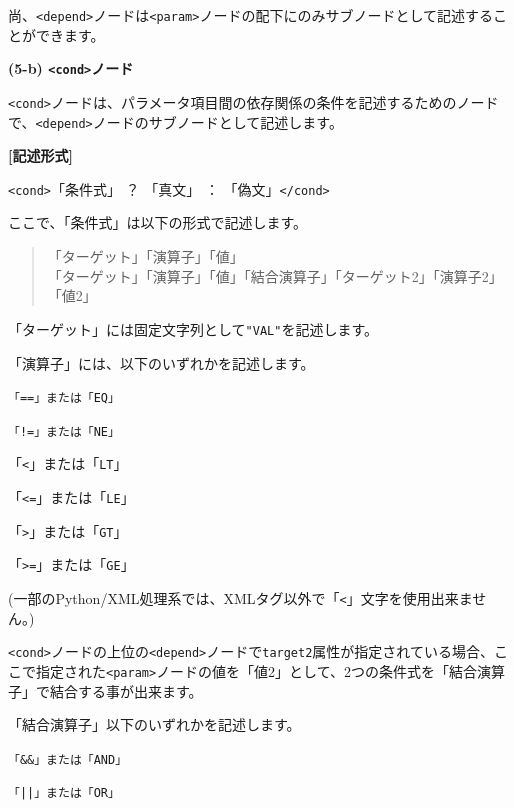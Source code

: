 \documentclass[a4paper,11pt]{jarticle}
\begin{document}
{\vspace{12pt}
尚、\texttt{<depend>}ノードは\texttt{<param>}ノードの配下にのみサブノードとして記述することができます。

\vspace{12pt}
\textbf{(5-b) \texttt{<cond>}ノード}

\texttt{<cond>}ノードは、パラメータ項目間の依存関係の条件を記述するためのノードで、\texttt{<depend>}ノードのサブノードとして記述します。

\vspace{8pt}
\leftskip=12pt
\textbf{[記述形式]}

\leftskip=42pt
\texttt{<cond>}「条件式」 ？ 「真文」 ： 「偽文」\texttt{</cond>}

\vspace{8pt}
\leftskip=0pt
ここで、「条件式」は以下の形式で記述します。
\begin{quote}
「ターゲット」「演算子」「値」\\
「ターゲット」「演算子」「値」「結合演算子」「ターゲット2」「演算子2」「値2」
\end{quote}

「ターゲット」には固定文字列として\texttt{"VAL"}を記述します。

\vspace{12pt}

「演算子」には、以下のいずれかを記述します。

\leftskip=10pt
{\tt 「==」または「EQ」}

{\tt 「!=」または「NE」}

「\texttt{<}」または「{\tt LT}」

「\texttt{<=}」または「{\tt LE}」

「\texttt{>}」または「{\tt GT}」

「\texttt{>=}」または「{\tt GE}」

\leftskip=0pt
(一部のPython/XML処理系では、XMLタグ以外で「\texttt{<}」文字を使用出来ません。)

\medskip
\texttt{<cond>}ノードの上位の\texttt{<depend>}ノードで\texttt{target2}属性が指定されている場合、ここで指定された\texttt{<param>}ノードの値を「値2」として、2つの条件式を「結合演算子」で結合する事が出来ます。

「結合演算子」以下のいずれかを記述します。

\leftskip=10pt
{\tt 「\&\&」または「AND」}

{\tt 「||」または「OR」}


\vspace{12pt}

}
\end{document}
